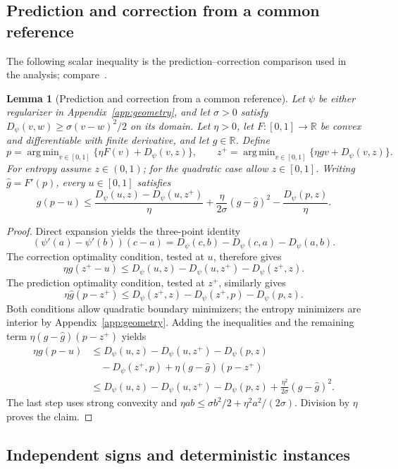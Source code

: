 \documentclass[11pt]{article}
\DeclareMathOperator*{\argmin}{arg\,min}
\newcommand{\Real}{\mathbb{R}}
\theoremstyle{plain}
\newtheorem{Thm:Lemma}[Thm:Theorem]{Lemma}
\theoremstyle{remark}
\numberwithin{equation}{section}
\begin{document}
\subsection{Prediction and correction from a common reference}
\label{app:prediction}

The following scalar inequality is the prediction--correction comparison
used in the analysis; compare~\cite[Lemma~3]{RakhlinSridharan2013}.

\begin{Thm:Lemma}[Prediction and correction from a common reference]
\label{app:lem:optimistic}
Let $\psi$ be either regularizer in Appendix~\ref{app:geometry}, and let
$\sigma>0$ satisfy
$D_\psi(v,w)\ge \sigma(v-w)^2/2$ on its domain.
Let $\eta>0$, let $F:[0,1]\to\Real$ be convex and differentiable with
finite derivative, and let $g\in\Real$. Define
\[
 p=\argmin_{v\in[0,1]}\{\eta F(v)+D_\psi(v,z)\},\qquad
 z^+=\argmin_{v\in[0,1]}\{\eta gv+D_\psi(v,z)\}.
\]
For entropy assume $z\in(0,1)$; for the quadratic case allow $z\in[0,1]$.
Writing $\widehat g=F'(p)$, every $u\in[0,1]$ satisfies
\[
 g(p-u)\le
 \frac{D_\psi(u,z)-D_\psi(u,z^+)}{\eta}
 +\frac{\eta}{2\sigma}(g-\widehat g)^2
 -\frac{D_\psi(p,z)}{\eta}.
\]
\end{Thm:Lemma}
\begin{proof}
Direct expansion yields the three-point identity
\[
 (\psi'(a)-\psi'(b))(c-a)
 =D_\psi(c,b)-D_\psi(c,a)-D_\psi(a,b).
\]
The correction optimality condition, tested at $u$, therefore gives
\[
 \eta g(z^+-u)
 \le D_\psi(u,z)-D_\psi(u,z^+)-D_\psi(z^+,z).
\]
The prediction optimality condition, tested at $z^+$, similarly gives
\[
 \eta\widehat g(p-z^+)
 \le D_\psi(z^+,z)-D_\psi(z^+,p)-D_\psi(p,z).
\]
Both conditions allow quadratic boundary minimizers; the entropy
minimizers are interior by Appendix~\ref{app:geometry}.
Adding the inequalities and the remaining term
$\eta(g-\widehat g)(p-z^+)$ yields
\begin{align*}
 \eta g(p-u)
 &\le D_\psi(u,z)-D_\psi(u,z^+)-D_\psi(p,z)\\
 &\quad-D_\psi(z^+,p)+\eta(g-\widehat g)(p-z^+)\\
 &\le D_\psi(u,z)-D_\psi(u,z^+)-D_\psi(p,z)
       +\frac{\eta^2}{2\sigma}(g-\widehat g)^2.
\end{align*}
The last step uses strong convexity and
$\eta ab\le \sigma b^2/2+\eta^2a^2/(2\sigma)$.
Division by $\eta$ proves the claim.
\end{proof}

\subsection{Independent signs and deterministic instances}
\label{app:signs}
\end{document}
